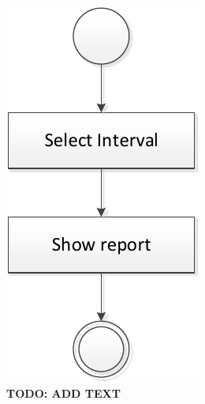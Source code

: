 \begin{figure}
\centerline{\includegraphics[width=\textwidth]{img/activity_diagrams/Show_report}}
\caption{\textbf{TODO: ADD TEXT}}
\label{fig:activity_sr}
\end{figure}